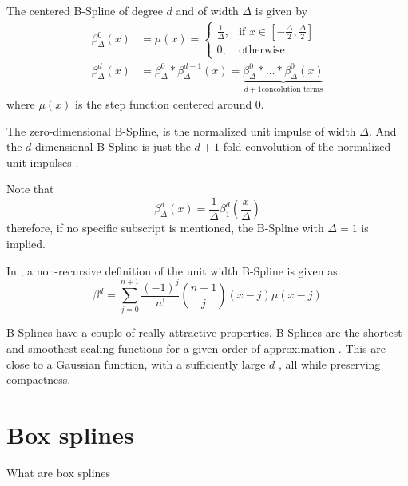 \begin{definition}
    \label{def:bspline}
    The centered B-Spline of degree $d$ and of width $\Delta$ is given by
    \begin{align*}
        \beta_\Delta^0(x) &= \mu(x) = 
            \begin{cases}
                \frac{1}{\Delta}, & \text{if } x \in [-\frac{\Delta}{2}, \frac{\Delta}{2}]\\
                0,           & \text{otherwise}
            \end{cases} \\
           \beta_\Delta^d(x) &= \beta_\Delta^0 * \beta_\Delta^{d-1}(x) = 
               \underbrace{\beta_\Delta^0 * \dots * \beta_\Delta^0(x)}_{d+1 \text{concolution terms}}
    \end{align*}
    where $\mu(x)$ is the step function centered around 0. 

    The zero-dimensional B-Spline, is the normalized unit impulse of width $\Delta$. And the 
    $d$-dimensional B-Spline is just the $d+1$ fold convolution of the normalized unit impulses
    \cite{horbelt_discretization_2002}.

    Note that
    \[ \beta_\Delta^d(x) = \frac{1}{\Delta} \beta_1^d(\frac{x}{\Delta}) \]
    therefore, if no specific subscript is mentioned, the B-Spline with $\Delta = 1$ is implied.

    In \cite{unser_fast_1991}, a non-recursive definition of the unit width B-Spline is given as:
    \[ \beta^d = \sum_{j=0}^{n+1} \frac{(-1)^j}{n!} \binom{n+1}{j}(x - j)\mu(x - j) \] 
\end{definition}

B-Splines have a couple of really attractive properties. B-Splines are the shortest and smoothest
scaling functions for a given order of approximation \cite{momey_b-spline_2012}. This
are close to a Gaussian function,
with a sufficiently large $d$ \cite{momey_b-spline_2012}, all while preserving compactness.


\cite{unser_b-spline_1993}
\cite{unser_b-spline_1993-1}
\cite{unser_fast_1991}
\cite{briand_theory_2018}
 
\section{Box splines}

What are box splines

\cite{entezari_box_2012}
\cite{de_boor_box_1993}
